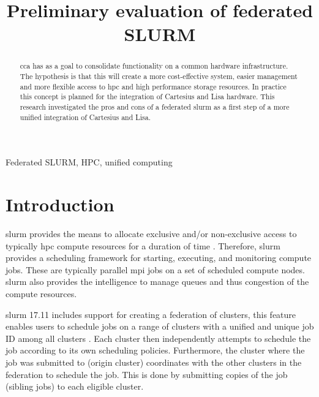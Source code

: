 \documentclass[conference]{IEEEtran}
\begin{document}
\title{Preliminary evaluation of federated SLURM}

\author{
}

\maketitle

\begin{abstract}
\gls{cca} has as a goal to consolidate functionality on a common hardware infrastructure. The hypothesis is that this will create a more cost-effective system, easier management and more flexible access to \gls{hpc} and high performance storage resources. In practice this concept is planned for the integration of Cartesius \cite{cartesius-userinfo} and Lisa \cite{lisa-userinfo} hardware. This research investigated the pros and cons of a federated \gls{slurm} as a first step of a more unified integration of Cartesius and Lisa.
\end{abstract}

\begin{IEEEkeywords}
Federated SLURM, HPC, unified computing
\end{IEEEkeywords}


\section{Introduction}
\label{sec-introduction}
\gls{slurm} provides the means to allocate exclusive and/or non-exclusive access to typically \gls{hpc} compute resources for a duration of time \cite{wiki-slurm}. Therefore, \gls{slurm} provides a scheduling framework for starting, executing, and monitoring compute jobs. These are typically parallel \gls{mpi} jobs on a set of scheduled compute nodes. \gls{slurm} also provides the intelligence to manage queues and thus congestion of the compute resources.

\gls{slurm} 17.11 includes support for creating a federation of clusters, this feature enables users to schedule jobs on a range of clusters with a unified and unique job ID among all clusters \cite{slurm-federated-guide}. Each cluster then independently attempts to schedule the job according to its own scheduling policies. Furthermore, the cluster where the job was submitted to (origin cluster) coordinates with the other clusters in the federation to schedule the job. This is done by submitting copies of the job (sibling jobs) to each eligible cluster.
\end{document}
